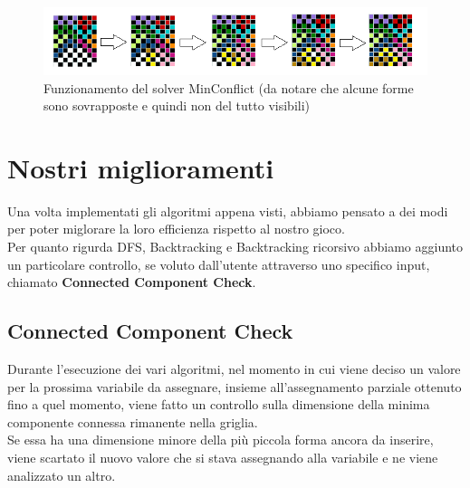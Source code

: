 \begin{figure}[h]
	\centering
	\includegraphics[scale=0.75]{immagini/mc}
	\caption{Funzionamento del solver MinConflict (da notare che alcune forme sono sovrapposte e quindi non del tutto visibili)}
	\label{fig:mc}
\end{figure}


\newpage
\section{Nostri miglioramenti}
\label{migliorie}
Una volta implementati gli algoritmi appena visti, abbiamo pensato a dei modi per poter miglorare la loro efficienza rispetto al nostro gioco. \\
Per quanto rigurda DFS, Backtracking e Backtracking ricorsivo abbiamo aggiunto un particolare controllo, se voluto dall'utente attraverso uno specifico input, chiamato \textbf{Connected Component Check}.
\subsection{Connected Component Check}
Durante l'esecuzione dei vari algoritmi, nel momento in cui viene deciso un valore per la prossima variabile da assegnare, insieme all'assegnamento parziale ottenuto fino a quel momento, viene fatto un controllo sulla dimensione della minima componente connessa rimanente nella griglia. \\
Se essa ha una dimensione minore della più piccola forma ancora da inserire, viene scartato il nuovo valore che si stava assegnando alla variabile e ne viene analizzato un altro. 

